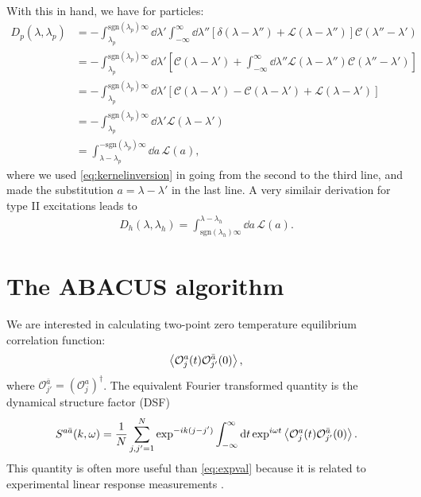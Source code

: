 \documentclass[11pt, a4paper,draft]{report} %
\newcommand{\inversetruncc}{\mathcal{L}}
\newcommand{\kernel}{\mathcal{C}}
\newcommand{\operator}{\mathcal{O}}
\begin{document}
With this in hand, we have for particles:
\begin{align}
	D_p(\lambda, \lambda_p) &= - \int_{\lambda_p}^{\textrm{sgn}(\lambda_p)\infty} \dd \lambda' \int_{-\infty}^{\infty} \dd  \lambda'' \left[\delta(\lambda-\lambda'') + \inversetruncc(\lambda-\lambda'') \right]\kernel(\lambda''-\lambda')\\
	&= - \int_{\lambda_p}^{\textrm{sgn}(\lambda_p)\infty} \dd \lambda' \left[\kernel(\lambda-\lambda') + \int_{-\infty}^{\infty} \dd  \lambda'' \inversetruncc(\lambda-\lambda'') \kernel(\lambda''-\lambda')\right]\\
	&= - \int_{\lambda_p}^{\textrm{sgn}(\lambda_p)\infty} \dd \lambda' \left[\kernel(\lambda-\lambda') - \kernel(\lambda-\lambda') + \inversetruncc(\lambda-\lambda')\right]\\
	&= - \int_{\lambda_p}^{\textrm{sgn}(\lambda_p)\infty} \dd \lambda' \inversetruncc(\lambda-\lambda')\\
	&=  \int_{\lambda-\lambda_p}^{-\textrm{sgn}(\lambda_p)\infty} \dd a \, \inversetruncc(a),
\end{align}
where we used \cref{eq:kernelinversion} in going from the second to the third line, and made the substitution \(a = \lambda-\lambda'\) in the last line.
A very similair derivation for type II excitations leads to
\begin{align}
	D_h(\lambda,\lambda_h) = \int_{\textrm{sgn}(\lambda_h)\infty}^{\lambda-\lambda_h} \dd a\, \inversetruncc(a).
\end{align}




\chapter{The ABACUS algorithm}

We are interested in calculating two-point zero temperature equilibrium correlation function:
\begin{equation}\label{eq:expval}
	\expval{\operator_j^a(t)\operator_{j'}^{\bar{a}}(0)},
\end{equation}
where \(\operator_{j'}^{\bar{a}} = (\operator_j^a)^{\dagger}\).
The equivalent Fourier transformed quantity is the dynamical structure factor (DSF)
\begin{equation}
	S^{a\bar{a}}(k,\omega) = \frac{1}{N} \sum_{j,j'=1}^{N} \exp^{-ik(j-j')} \int_{-\infty}^{\infty}\dd t \exp^{i\omega t}\expval{\operator_j^a(t)\operator_{j'}^{\bar{a}}(0)}.
\end{equation}
This quantity is often more useful than \cref{eq:expval} because it is related to experimental linear response measurements \cite{Caux2009}.
\end{document}
